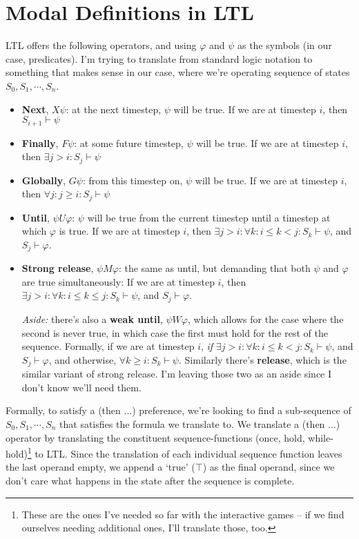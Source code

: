 \documentclass{article}
\begin{document}
\section{Modal Definitions in LTL}
LTL offers the following operators, and using $\varphi$ and $\psi$ as the symbols (in our case, predicates). 
I'm trying to translate from standard logic notation to something that makes sense in our case, where we're operating sequence of states $S_0, S_1, \cdots, S_n$. 
\begin{itemize}
    \item \textbf{Next}, $X \psi$: at the next timestep, $\psi$ will be true. If we are at timestep $i$, then $S_{i+1} \vdash \psi$
    
    \item \textbf{Finally}, $F \psi$: at some future timestep, $\psi$ will be true. If we are at timestep $i$, then $\exists j > i:  S_{j} \vdash \psi$
    
    \item \textbf{Globally}, $G \psi$: from this timestep on, $\psi$ will be true. If we are at timestep $i$, then $\forall j: j \geq i: S_{j} \vdash \psi$
    
    \item \textbf{Until}, $\psi U \varphi$: $\psi$ will be true from the current timestep until a timestep at which $\varphi$ is true. If we are at timestep $i$, then $\exists j > i: \forall k: i \leq k < j: S_k \vdash \psi$, and $S_j \vdash \varphi$.
    \item \textbf{Strong release}, $\psi M \varphi$: the same as until, but demanding that both $\psi$ and $\varphi$ are true simultaneously: If we are at timestep $i$, then $\exists j > i: \forall k: i \leq k \leq j: S_k \vdash \psi$, and $S_j \vdash \varphi$. 
    
    \textit{Aside:} there's also a \textbf{weak until}, $\psi W \varphi$, which allows for the case where the second is never true, in which case the first must hold for the rest of the sequence. Formally, if we are at timestep $i$, \textit{if} $\exists j > i: \forall k: i \leq k < j: S_k \vdash \psi$, and $S_j \vdash \varphi$, and otherwise, $\forall k \geq i: S_k \vdash \psi$. Similarly there's \textbf{release}, which is the similar variant of strong release. I'm leaving those two as an aside since I don't know we'll need them. 
    
\end{itemize}

Formally, to satisfy a (then ...) preference, we're looking to find a sub-sequence of $S_0, S_1, \cdots, S_n$ that satisfies the formula we translate to. 
We translate a (then ...) operator by translating the constituent sequence-functions (once, hold, while-hold)\footnote{These are the ones I've needed so far with the interactive games -- if we find ourselves needing additional ones, I'll translate those, too.} to LTL. 
Since the translation of each individual sequence function leaves the last operand empty, we append a `true' ($\top$) as the final operand, since we don't care what happens in the state after the sequence is complete. 
\end{document}
